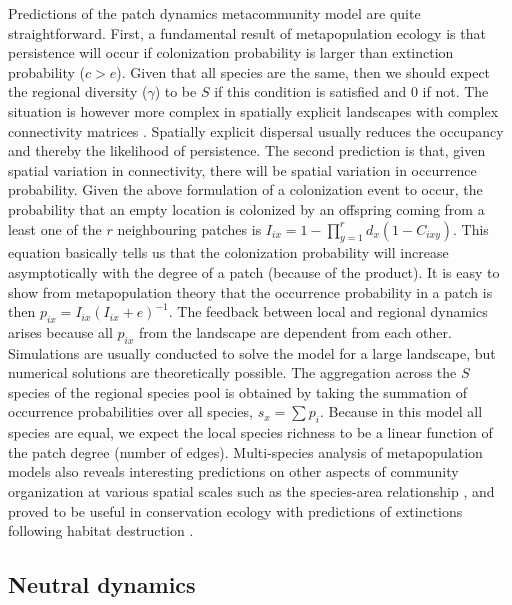 \documentclass[12pt]{article}
\begin{document}
Predictions of the patch dynamics metacommunity model are quite straightforward.
First, a fundamental result of metapopulation ecology is that persistence will
occur if colonization probability is larger than extinction probability ($c>e$).
Given that all species are the same, then we should expect the regional
diversity ($\gamma$) to be $S$ if this condition is satisfied and $0$ if not.
The situation is however more complex in spatially explicit landscapes with
complex connectivity matrices \parencite{Hanski1998}. Spatially explicit
dispersal usually reduces the occupancy and thereby the likelihood of
persistence. The second prediction is that, given spatial variation in
connectivity, there will be spatial variation in occurrence probability. Given
the above formulation of a colonization event to occur, the probability that an
empty location is colonized by an offspring coming from a least one of the $r$ neighbouring patches is $I_{ix}=1-\prod_{y=1}^r d_x(1-C_{ixy})$. This equation
basically tells us that the colonization probability will increase
asymptotically with the degree of a patch (because of the product). It is easy
to show from metapopulation theory that the occurrence probability in a patch is
then $p_{ix}=I_{ix}(I_{ix}+e)^{-1}$. The feedback between local and regional dynamics
arises because all $p_{ix}$ from the landscape are dependent from each other.
Simulations are usually conducted to solve the model for a large landscape, but
numerical solutions are theoretically possible. The aggregation across the $S$
species of the regional species pool is obtained by taking the summation of
occurrence probabilities over all species, $s_x = \sum{p_i}$. Because in this
model all species are equal, we expect the local species richness to be a linear
function of the patch degree (number of edges). Multi-species analysis of
metapopulation models also reveals interesting predictions on other aspects of
community organization at various spatial scales such as the species-area
relationship \parencite{Hanski1997}, and proved to be useful in conservation
ecology with predictions of extinctions following habitat destruction
\parencite{Tilman1994b,Rybicki2013}.

\subsection*{Neutral dynamics}
\end{document}

